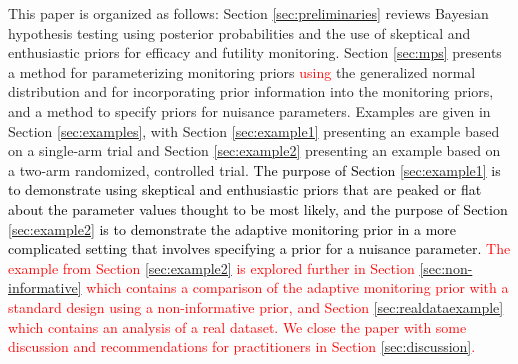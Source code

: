 \documentclass[12pt]{article}
\begin{document}
This paper is organized as follows: %
Section \ref{sec:preliminaries} reviews Bayesian hypothesis testing using posterior probabilities and the use of  skeptical and enthusiastic priors for efficacy and futility monitoring. 
%
Section \ref{sec:mps} presents a method for parameterizing monitoring priors \textcolor{red}{using} the generalized normal distribution and for incorporating prior information into the monitoring priors, and a method to specify priors for nuisance parameters.
%
Examples are given in Section \ref{sec:examples}, with Section \ref{sec:example1} presenting an example based on a single-arm trial and Section \ref{sec:example2} presenting an example based on a two-arm randomized, controlled trial. \textcolor{black}{The purpose of Section \ref{sec:example1} is to demonstrate using skeptical and enthusiastic priors that are peaked or flat about the parameter values thought to be most likely, and the purpose of Section \ref{sec:example2} is to demonstrate the adaptive monitoring prior in a more complicated setting that involves specifying a prior for a nuisance parameter.} \textcolor{red}{The example from Section \ref{sec:example2} is explored further in Section \ref{sec:non-informative} which contains a comparison of the adaptive monitoring prior with a standard design using a non-informative prior, and Section \ref{sec:realdataexample} which contains an analysis of a real dataset. We close the paper with some discussion and recommendations for practitioners in Section \ref{sec:discussion}.}
\end{document}
